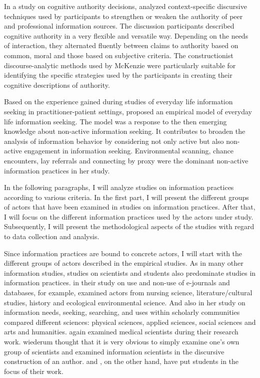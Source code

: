 \documentclass[12pt, a4paper, titlepage, oneside, abstract=true, toc=listof, toc=bibliography]{scrreprt}
\begin{document}
In a study on cognitive authority decisions, \citep{McKenzie2003} analyzed context-specific discursive techniques used by participants to strengthen or weaken the authority of peer and professional information sources. The discussion participants described cognitive authority in a very flexible and versatile way. Depending on the needs of interaction, they alternated fluently between claims to authority based on common, moral and those based on subjective criteria. The constructionist discourse-analytic methods used by McKenzie were particularly suitable for identifying the specific strategies used by the participants in creating their cognitive descriptions of authority. 

Based on the experience gained during studies of everyday life information seeking in practitioner-patient settings, \citet{McKenzie2003a} proposed an empirical model of everyday life information seeking. The model was a response to the then emerging knowledge about non-active information seeking. It contributes to broaden the analysis of information behavior by considering not only active but also non-active engagement in information seeking. Environmental scanning, chance encounters, lay referrals and connecting by proxy were the dominant non-active information practices in her study. 

In the following paragraphs, I will analyze studies on information practices according to various criteria. In the first part, I will present the different groups of actors that have been examined in studies on information practices. After that, I will focus on the different information practices used by the actors under study. Subsequently, I will present the methodological aspects of the studies with regard to data collection and analysis. 

Since information practices are bound to concrete actors, I will start with the different groups of actors described in the empirical studies. As in many other information studies, studies on scientists and students also predominate studies in information practices. \citet{Talja2003} in their study on use and non-use of e-journals and databases, for example, examined actors from nursing science, literature/cultural studies, history and ecological environmental science. And also \citet{Fry2006} in her study on information needs, seeking, searching, and uses within scholarly communities compared different sciences: physical sciences, applied sciences, social sciences and arts and humanities. \citet{Roos2015} again examined medical scientists during their research work. \citet{Olsson2007} wiederum thought that it is very obvious to simply examine one's own group of scientists and examined information scientists in the discursive construction of an author. \citep{Boyum2015} and \citep{AhenkorahMarfo2016}, on the other hand, have put students in the focus of their work. 
\end{document}
